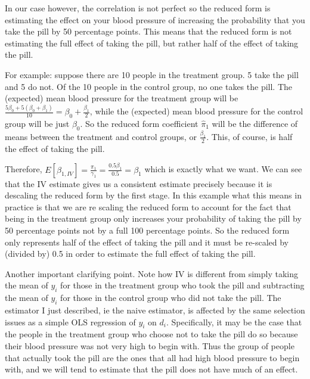 \documentclass[
]{article}
\begin{document}
In our case however, the correlation is not perfect so the reduced form
is estimating the effect on your blood pressure of increasing the
probability that you take the pill by 50 percentage points. This means
that the reduced form is not estimating the full effect of taking the
pill, but rather half of the effect of taking the pill.

For example: suppose there are 10 people in the treatment group. 5 take
the pill and 5 do not. Of the 10 people in the control group, no one
takes the pill. The (expected) mean blood pressure for the treatment
group will be
\(\frac{5\beta_0+5(\beta_0+\beta_1)}{10}=\beta_0+\frac{\beta_1}{2}\),
while the (expected) mean blood pressure for the control group will be
just \(\beta_0\). So the reduced form coefficient \(\hat{\pi}_1\) will
be the difference of means between the treatment and control groups, or
\(\frac{\beta_1}{2}\). This, of course, is half the effect of taking the
pill.

Therefore,
\(E[\beta_{1,IV}]=\frac{\pi_1}{\gamma_1}=\frac{0.5\beta_1}{0.5}=\beta_1\)
which is exactly what we want. We can see that the IV estimate gives us
a consistent estimate precisely because it is descaling the reduced form
by the first stage. In this example what this means in practice is that
we are re scaling the reduced form to account for the fact that being in
the treatment group only increases your probability of taking the pill
by 50 percentage points not by a full 100 percentage points. So the
reduced form only represents half of the effect of taking the pill and
it must be re-scaled by (divided by) 0.5 in order to estimate the full
effect of taking the pill.

Another important clarifying point. Note how IV is different from simply
taking the mean of \(y_i\) for those in the treatment group who took the
pill and subtracting the mean of \(y_i\) for those in the control group
who did not take the pill. The estimator I just described, ie the naive
estimator, is affected by the same selection issues as a simple OLS
regression of \(y_i\) on \(d_i\). Specifically, it may be the case that
the people in the treatment group who choose not to take the pill do so
because their blood pressure was not very high to begin with. Thus the
group of people that actually took the pill are the ones that all had
high blood pressure to begin with, and we will tend to estimate that the
pill does not have much of an effect.
\end{document}
